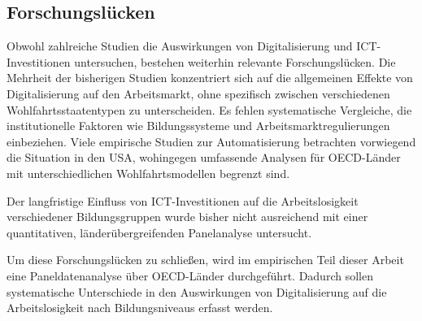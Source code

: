 
\subsection{Forschungslücken}

Obwohl zahlreiche Studien die Auswirkungen von Digitalisierung und \ac{ICT}-Investitionen 
untersuchen, bestehen weiterhin relevante Forschungslücken. Die Mehrheit der bisherigen 
Studien konzentriert sich auf die allgemeinen Effekte von Digitalisierung auf den 
Arbeitsmarkt, ohne spezifisch zwischen verschiedenen Wohlfahrtsstaatentypen zu 
unterscheiden. Es fehlen systematische Vergleiche, die institutionelle Faktoren wie 
Bildungssysteme und Arbeitsmarktregulierungen einbeziehen. Viele empirische Studien zur 
Automatisierung betrachten vorwiegend die Situation in den USA, wohingegen umfassende 
Analysen für \ac{OECD}-Länder mit unterschiedlichen Wohlfahrtsmodellen begrenzt sind.

Der langfristige Einfluss von \ac{ICT}-Investitionen auf die Arbeitslosigkeit 
verschiedener Bildungsgruppen wurde bisher nicht ausreichend mit einer quantitativen, 
länderübergreifenden Panelanalyse untersucht.

Um diese Forschungslücken zu schließen, wird im empirischen Teil dieser Arbeit eine 
Paneldatenanalyse über \ac{OECD}-Länder durchgeführt. Dadurch sollen systematische 
Unterschiede in den Auswirkungen von Digitalisierung auf die Arbeitslosigkeit nach 
Bildungsniveaus erfasst werden.
